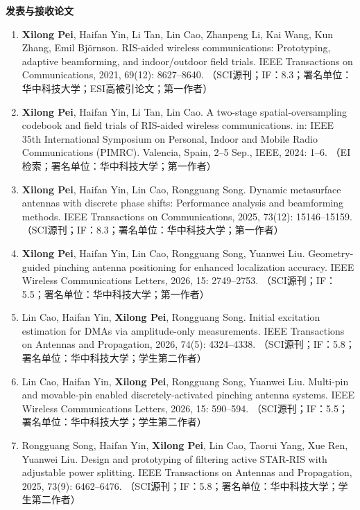 \begin{publications}
\noindent
\textbf{发表与接收论文}
\renewcommand{\labelenumi}{[\arabic{enumi}]}
\begin{enumerate}
	\item \textbf{Xilong Pei}, Haifan Yin, Li Tan, Lin Cao, Zhanpeng Li, Kai Wang, Kun Zhang, Emil Bj\"ornson.
	RIS-aided wireless communications: Prototyping, adaptive beamforming, and indoor/outdoor field trials.
	IEEE Transactions on Communications, 2021, 69(12): 8627--8640. 
	（SCI源刊；IF：8.3；署名单位：华中科技大学；ESI高被引论文；第一作者）
	
	\item \textbf{Xilong Pei}, Haifan Yin, Li Tan, Lin Cao.
	A two-stage spatial-oversampling codebook and field trials of RIS-aided wireless communications.
	in: IEEE 35th International Symposium on Personal, Indoor and Mobile Radio Communications (PIMRC).
	Valencia, Spain, 2--5 Sep., IEEE, 2024: 1--6.
	（EI检索；署名单位：华中科技大学；第一作者）
	
	\item \textbf{Xilong Pei}, Haifan Yin, Lin Cao, Rongguang Song.
	Dynamic metasurface antennas with discrete phase shifts: Performance analysis and beamforming methods.
	IEEE Transactions on Communications, 2025, 73(12): 15146--15159.
	（SCI源刊；IF：8.3；署名单位：华中科技大学；第一作者）
	
	\item \textbf{Xilong Pei}, Haifan Yin, Lin Cao, Rongguang Song, Yuanwei Liu.
	Geometry-guided pinching antenna positioning for enhanced localization accuracy.
	IEEE Wireless Communications Letters, 2026, 15: 2749--2753.
	（SCI源刊；IF：5.5；署名单位：华中科技大学；第一作者）
	
	\item Lin Cao, Haifan Yin, \textbf{Xilong Pei}, Rongguang Song.
	Initial excitation estimation for DMAs via amplitude-only measurements.
	IEEE Transactions on Antennas and Propagation, 2026, 74(5): 4324--4338.
	（SCI源刊；IF：5.8；署名单位：华中科技大学；学生第二作者）
	
	\item Lin Cao, Haifan Yin, \textbf{Xilong Pei}, Rongguang Song, Yuanwei Liu.
	Multi-pin and movable-pin enabled discretely-activated pinching antenna systems.
	IEEE Wireless Communications Letters, 2026, 15: 590--594. 
	（SCI源刊；IF：5.5；署名单位：华中科技大学；学生第二作者）
	
	\item Rongguang Song, Haifan Yin, \textbf{Xilong Pei}, Lin Cao, Taorui Yang, Xue Ren, Yuanwei Liu.
	Design and prototyping of filtering active STAR-RIS with adjustable power splitting.
	IEEE Transactions on Antennas and Propagation, 2025, 73(9): 6462--6476.
	（SCI源刊；IF：5.8；署名单位：华中科技大学；学生第二作者）
	

\end{enumerate}
\end{publications}
